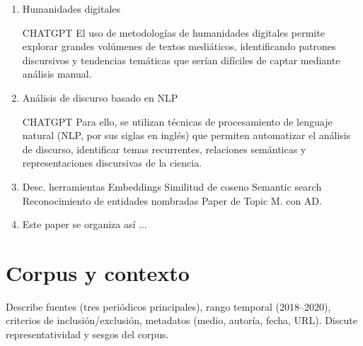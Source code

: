 \documentclass[11pt,a4paper]{article}
\begin{document}
\begin{enumerate}
		CHATGPT Las columnas de opinión constituyen un espacio privilegiado para observar la esfera pública mediática. A diferencia de las noticias, no buscan únicamente informar, sino también interpretar, evaluar y debatir acontecimientos. En ellas convergen voces de periodistas, académicos, políticos y ciudadanos influyentes, que articulan marcos ideológicos y posicionamientos frente a temas de interés colectivo. Por esta razón, este estudio se centra en las columnas de opinión publicadas en medios colombianos, entendidas como un canal donde se manifiestan representaciones y debates públicos sobre múltiples temas incluido la ciencia.
		
		En ocasiones, científicos eligen como medio de comunicación escribir columnas de opinión. Al respecto \cite{Syfert2025} encuentran que los cientificos a menudo no tienen la suficiente retórica para convencer a lectores a cambiar sus opiniones a pesar de las pruebas científicas que expresan, a menudo escriben más para personas que ya tienen una opinión similar. 
		
		\item Humanidades digitales
		
		CHATGPT
		El uso de metodologías de humanidades digitales permite explorar grandes volúmenes de textos mediáticos, identificando patrones discursivos y tendencias temáticas que serían difíciles de captar mediante análisis manual.
		
 		\item Análisis de discurso basado en NLP
 		
 		CHATGPT 
 		Para ello, se utilizan técnicas de procesamiento de lenguaje natural (NLP, por sus siglas en inglés) que permiten automatizar el análisis de discurso, identificar temas recurrentes, relaciones semánticas y representaciones discursivas de la ciencia.
 		
		\item Desc. herramientas
			Embeddings
			Similitud de coseno
			Semantic search
			Reconocimiento de entidades nombradas
			Paper de Topic M. con AD.
		
		\item Este paper se organiza así ...
	\end{enumerate}


	
	\section{Corpus y contexto}
	Describe fuentes (tres periódicos principales), rango temporal (2018--2020), criterios de inclusión/exclusión, metadatos (medio, autoría, fecha, URL). Discute representatividad y sesgos del corpus.
	
\end{document}
